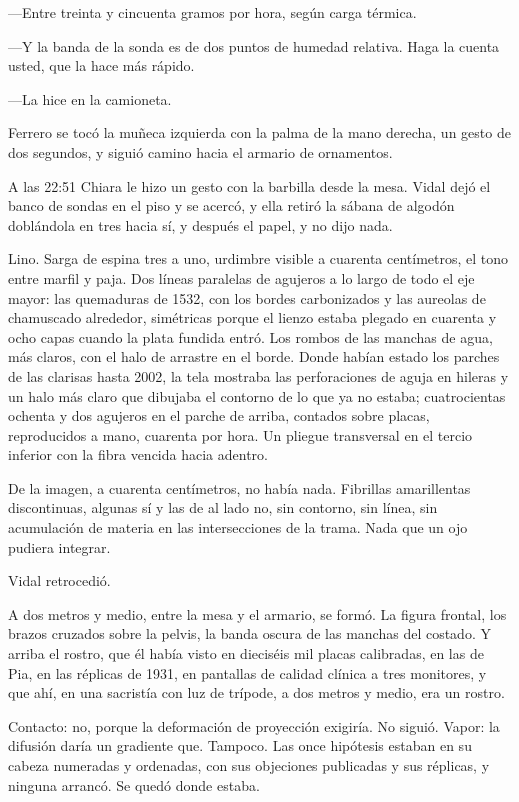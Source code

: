 ---Entre treinta y cincuenta gramos por hora, según carga térmica.

---Y la banda de la sonda es de dos puntos de humedad relativa. Haga la cuenta usted, que la hace más rápido.

---La hice en la camioneta.

Ferrero se tocó la muñeca izquierda con la palma de la mano derecha, un gesto de dos segundos, y siguió camino hacia el armario de ornamentos.

A las 22:51 Chiara le hizo un gesto con la barbilla desde la mesa. Vidal dejó el banco de sondas en el piso y se acercó, y ella retiró la sábana de algodón doblándola en tres hacia sí, y después el papel, y no dijo nada.

Lino. Sarga de espina tres a uno, urdimbre visible a cuarenta centímetros, el tono entre marfil y paja. Dos líneas paralelas de agujeros a lo largo de todo el eje mayor: las quemaduras de 1532, con los bordes carbonizados y las aureolas de chamuscado alrededor, simétricas porque el lienzo estaba plegado en cuarenta y ocho capas cuando la plata fundida entró. Los rombos de las manchas de agua, más claros, con el halo de arrastre en el borde. Donde habían estado los parches de las clarisas hasta 2002, la tela mostraba las perforaciones de aguja en hileras y un halo más claro que dibujaba el contorno de lo que ya no estaba; cuatrocientas ochenta y dos agujeros en el parche de arriba, contados sobre placas, reproducidos a mano, cuarenta por hora. Un pliegue transversal en el tercio inferior con la fibra vencida hacia adentro.

De la imagen, a cuarenta centímetros, no había nada. Fibrillas amarillentas discontinuas, algunas sí y las de al lado no, sin contorno, sin línea, sin acumulación de materia en las intersecciones de la trama. Nada que un ojo pudiera integrar.

Vidal retrocedió.

A dos metros y medio, entre la mesa y el armario, se formó. La figura frontal, los brazos cruzados sobre la pelvis, la banda oscura de las manchas del costado. Y arriba el rostro, que él había visto en dieciséis mil placas calibradas, en las de Pia, en las réplicas de 1931, en pantallas de calidad clínica a tres monitores, y que ahí, en una sacristía con luz de trípode, a dos metros y medio, era un rostro.

Contacto: no, porque la deformación de proyección exigiría. No siguió. Vapor: la difusión daría un gradiente que. Tampoco. Las once hipótesis estaban en su cabeza numeradas y ordenadas, con sus objeciones publicadas y sus réplicas, y ninguna arrancó. Se quedó donde estaba.

